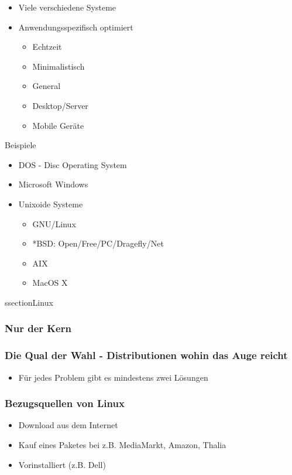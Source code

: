\documentclass[compress]{beamer}
\begin{document}
\begin{frame}
	\begin{block}{}
		\begin{itemize}
			\item Viele verschiedene Systeme 
			\item Anwendungsspezifisch optimiert
				\begin{itemize}
					\item Echtzeit
					\item Minimalistisch
					\item General
					\item Desktop/Server
					\item Mobile Geräte 
				\end{itemize}
		\end{itemize}
	\end{block}
	\begin{block}{Beispiele}
		\begin{itemize}
			\item DOS - Disc Operating System
			\item Microsoft Windows
			\item Unixoide Systeme
				\begin{itemize}
					\item GNU/Linux
					\item *BSD: Open/Free/PC/Dragefly/Net
					\item AIX
					\item MacOS X
				\end{itemize}
		\end{itemize}
	\end{block}
\end{frame}

ssection{Linux}

\begin{frame}
	\frametitle{Nur der Kern}
\end{frame}

\begin{frame}
	\frametitle{Die Qual der Wahl - Distributionen wohin das Auge reicht}
	\begin{block}{}
		\begin{itemize}
			\item Für jedes Problem gibt es mindestens zwei Lösungen
		\end{itemize}
	\end{block}
\end{frame}

\begin{frame}
	\frametitle{Bezugsquellen von Linux}
	\begin{itemize}
		\item Download aus dem Internet
		\item Kauf eines Paketes bei z.B. MediaMarkt, Amazon, Thalia
		\item Vorinstalliert (z.B. Dell)
	\end{itemize}
\end{frame}
\end{document}
